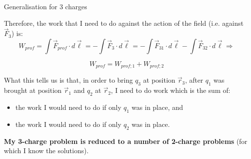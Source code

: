 %
%
%

\begin{frame}{Generalisation for 3 charges}

\vspace{0.2cm}
Therefore, the work that I need to do against the action of the field (i.e. against $\vec{F}_{3}$) is:
\begin{equation*}
  W_{prof} = \int \vec{F}_{prof} \cdot d\vec{\ell}
           = - \int \vec{F}_{3} \cdot d\vec{\ell}
           = - \int \vec{F}_{31} \cdot d\vec{\ell} - \int \vec{F}_{32} \cdot d\vec{\ell} \Rightarrow
\end{equation*}

\begin{equation*}
  W_{prof} = W_{prof;1} + W_{prof;2}
\end{equation*}

\vspace{0.3cm}
What this tells us is that, in order to bring $q_3$ at position $\vec{r}_3$,
after $q_1$ was brought at position $\vec{r}_1$ and $q_2$ at $\vec{r}_2$,
I need to do work which is the sum of:\\
\vspace{0.1cm}
\begin{itemize}
  \item the work I would need to do if only $q_1$ was in place, and
  \item the work I would need to do if only $q_2$ was in place.
\end{itemize}

{\bf My 3-charge problem is reduced to a number of 2-charge problems} (for which I know the solutions).

\end{frame}


%
%
%

